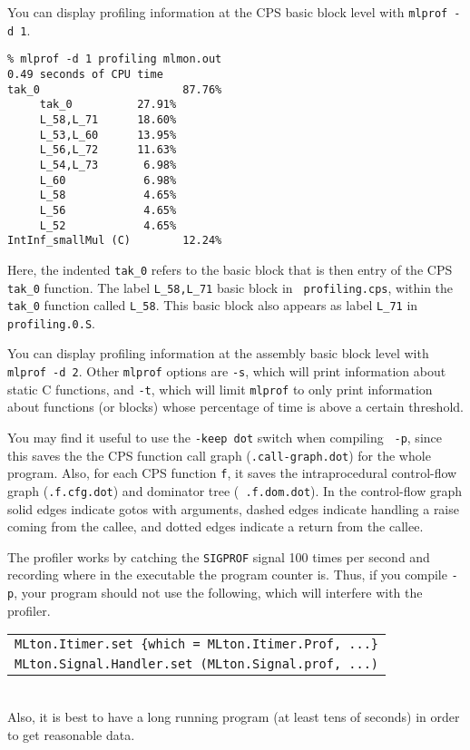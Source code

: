 You can display profiling information at the CPS basic block level with
{\tt mlprof -d 1}.

\begin{verbatim}
% mlprof -d 1 profiling mlmon.out
0.49 seconds of CPU time
tak_0                      87.76%
     tak_0          27.91%       
     L_58,L_71      18.60%       
     L_53,L_60      13.95%       
     L_56,L_72      11.63%       
     L_54,L_73       6.98%       
     L_60            6.98%       
     L_58            4.65%       
     L_56            4.65%       
     L_52            4.65%       
IntInf_smallMul (C)        12.24%
\end{verbatim}
Here, the indented {\tt tak\_0} refers to the basic block that is then entry of
the CPS {\tt tak\_0} function.  The label {\tt L\_58,L\_71} basic block in {\tt
profiling.cps}, within the {\tt tak\_0} function called {\tt L\_58}.  This basic
block also appears as label {\tt L\_71} in {\tt profiling.0.S}.

You can display profiling information at the assembly basic block level with
{\tt mlprof -d 2}.  Other {\tt mlprof} options are
{\tt -s}, which will print information about static C functions, and {\tt -t},
which will limit {\tt mlprof} to only print information about functions (or
blocks) whose percentage of time is above a certain threshold.

You may find it useful to use the {\tt -keep dot} switch when compiling {\tt
-p}, since this saves the the CPS function call graph ({\tt .call-graph.dot})
for the whole program.  Also, for each CPS function {\tt f}, it saves the
intraprocedural control-flow graph ({\tt .f.cfg.dot}) and dominator tree ({\tt
.f.dom.dot}).  In the control-flow graph solid edges indicate gotos with
arguments, dashed edges indicate handling a raise coming from the callee, and
dotted edges indicate a return from the callee.

The profiler works by catching the {\tt SIGPROF} signal 100 times per second and
recording where in the executable the program counter is.  Thus, if you compile
{\tt -p}, your program should not use the following, which will interfere with
the profiler.\\
\begin{tabular}{l}
\tt MLton.Itimer.set \{which = MLton.Itimer.Prof, ...\}\\
\tt MLton.Signal.Handler.set (MLton.Signal.prof, ...)
\end{tabular}\\
Also, it is best to have a long running program (at least tens of seconds) in
order to get reasonable data. 

